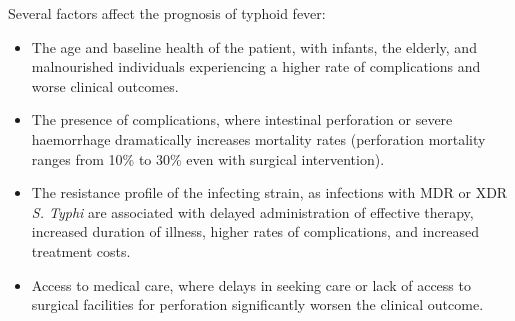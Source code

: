 Several factors affect the prognosis of typhoid fever:
\begin{itemize}
  \item The age and baseline health of the patient, with infants, the elderly, and malnourished individuals experiencing a higher rate of complications and worse clinical outcomes.
  \item The presence of complications, where intestinal perforation or severe haemorrhage dramatically increases mortality rates (perforation mortality ranges from 10\% to 30\% even with surgical intervention).
  \item The resistance profile of the infecting strain, as infections with MDR or XDR \textit{S. Typhi} are associated with delayed administration of effective therapy, increased duration of illness, higher rates of complications, and increased treatment costs.
  \item Access to medical care, where delays in seeking care or lack of access to surgical facilities for perforation significantly worsen the clinical outcome.
\end{itemize}

